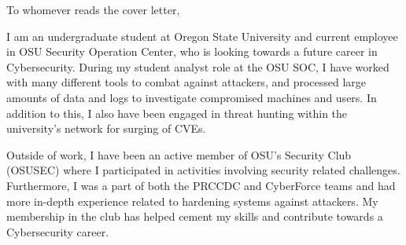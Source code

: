 \documentclass[11pt]{article} %
\begin{document}



To whomever reads the cover letter,

I am an undergraduate student at Oregon State University and current employee in OSU Security Operation Center,
who is looking towards a future career in Cybersecurity. During my student analyst role at the OSU SOC, I have worked with 
many different tools to combat against attackers, and processed large amounts of data and logs to investigate compromised
machines and users. In addition to this, I also have been engaged in threat hunting within the university's network for surging
of CVEs.

Outside of work, I have been an active member of OSU's Security Club (OSUSEC) where I participated in activities involving 
security related challenges. Furthermore, I was a part of both the PRCCDC and CyberForce teams and had more in-depth experience 
related to hardening systems against attackers. My membership in the club has helped cement my skills and contribute towards a 
Cybersecurity career.
\end{document}
